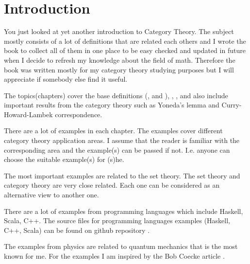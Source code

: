 \chapter*{Introduction}

You just looked at yet another introduction to Category Theory. The
subject mostly consists of a lot of definitions that are related each
others and I wrote the book to collect all of them in one
place to be easy checked and updated in future when I decide to refresh
my knowledge about the field of math. Therefore the book was written mostly
for my category theory studying 
purposes but I will appreciate if somebody else find it useful.

The topics(chapters) cover the base definitions
(,  and
), ,
,  and also include important
results from the category theory such as Yoneda's lemma and
Curry-Howard-Lambek correspondence. 

There are a lot of 
examples in each chapter. The examples cover different category
theory application areas. I assume that the reader is familiar with
the corresponding area and the example(s) can be passed if not. I.e.
anyone can choose the suitable example(s) for (s)he. 

The most important examples are related to the set theory. The set
theory and category theory are very close related. Each one can be
considered as an alternative view to another one.

There are a lot of examples from programming languages which include
Haskell, Scala, C++. The source files for programming languages 
examples (Haskell, C++, Scala) can be found on github repository
\cite{bib:github:ivanmurashko}.  

The examples from physics are related to quantum mechanics that is the
most known for me. For the examples I am inspired by the Bob Coecke
article \cite{bib:arxiv:Bob_Coecke_2008}.




